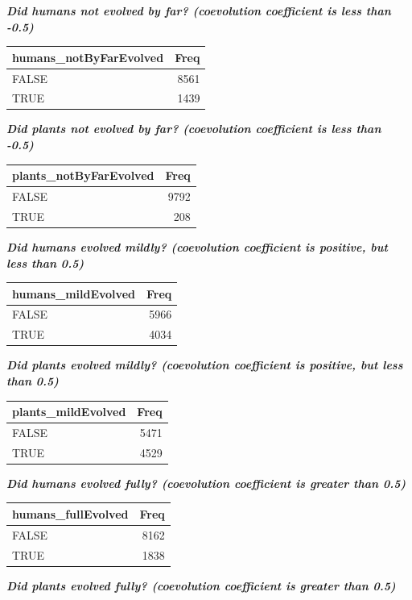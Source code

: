 \documentclass[
]{book}
\begin{document}
\textbf{\emph{Did humans not evolved by far? (coevolution coefficient is less than -0.5)}}

\begin{tabular}{l|r}
\hline
humans\_notByFarEvolved & Freq\\
\hline
FALSE & 8561\\
\hline
TRUE & 1439\\
\hline
\end{tabular}

\textbf{\emph{Did plants not evolved by far? (coevolution coefficient is less than -0.5)}}

\begin{tabular}{l|r}
\hline
plants\_notByFarEvolved & Freq\\
\hline
FALSE & 9792\\
\hline
TRUE & 208\\
\hline
\end{tabular}

\textbf{\emph{Did humans evolved mildly? (coevolution coefficient is positive, but less than 0.5)}}

\begin{tabular}{l|r}
\hline
humans\_mildEvolved & Freq\\
\hline
FALSE & 5966\\
\hline
TRUE & 4034\\
\hline
\end{tabular}

\textbf{\emph{Did plants evolved mildly? (coevolution coefficient is positive, but less than 0.5)}}

\begin{tabular}{l|r}
\hline
plants\_mildEvolved & Freq\\
\hline
FALSE & 5471\\
\hline
TRUE & 4529\\
\hline
\end{tabular}

\textbf{\emph{Did humans evolved fully? (coevolution coefficient is greater than 0.5)}}

\begin{tabular}{l|r}
\hline
humans\_fullEvolved & Freq\\
\hline
FALSE & 8162\\
\hline
TRUE & 1838\\
\hline
\end{tabular}

\textbf{\emph{Did plants evolved fully? (coevolution coefficient is greater than 0.5)}}
\end{document}

